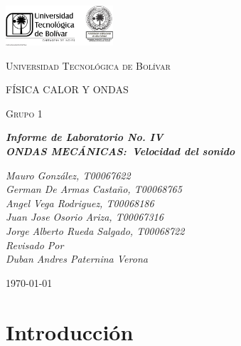 \documentclass[twocolumn, 12pt]{article}
\begin{document}
\begin{titlepage}
    \centering
    \includegraphics[width=0.3\textwidth]{Images/logo_utb.png}\par\vspace{1cm}
    {\scshape\LARGE Universidad Tecnológica de Bolívar \par}
    \vspace{1cm}

    {\scshape\Large FÍSICA CALOR Y ONDAS \par}
    \vspace{.2cm}

    {\scshape\Large Grupo 1 \par}
    \vspace{1cm}
    \slshape {\Large \bfseries{}Informe de Laboratorio No. IV\\}
    \slshape {\small \bfseries{}ONDAS MECÁNICAS:~Velocidad del sonido}
    \vspace{2cm}

    \slshape {\itshape{} Mauro González, T00067622 \\}
    \slshape {\itshape{} German De Armas Castaño, T00068765 \\}
    \slshape {\itshape{} Angel Vega Rodriguez, T00068186 \\}
    \slshape {\itshape{} Juan Jose Osorio Ariza, T00067316 \\}
    \slshape {\itshape{} Jorge Alberto Rueda Salgado, T00068722 \\}
    \vfill
    Revisado Por \\
    Duban Andres Paternina Verona\\
    {\large \today\par}
\end{titlepage}


\section{Introducción}
\end{document}

